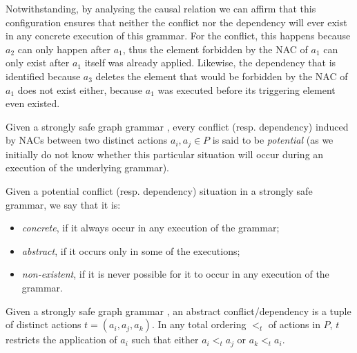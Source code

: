 \begin{example}
Notwithstanding, by analysing the causal relation we can affirm that this configuration ensures that neither the conflict nor the dependency will ever exist in any concrete execution of this grammar. For the conflict, this happens because $a_2$ can only happen after $a_1$, thus the element forbidden by the NAC of $a_1$ can only exist after $a_1$ itself was already applied. Likewise, the dependency that is identified because $a_3$ deletes the element that would be forbidden by the NAC of $a_1$
  does not exist either, because $a_1$ was executed before its triggering element even existed.
\end{example}

\begin{definition}\label{def:conflict-dependency-characterization} Given a strongly safe graph grammar \doublyTypedGraphGrammarCore{}, every conflict (resp. dependency) induced by NACs between two distinct actions $a_i, a_j \in P$ is said to be \emph{potential} (as we initially do not know whether this particular situation will occur during an execution of the underlying grammar). %

    Given a potential conflict (resp. dependency) situation in a strongly safe grammar, we say that it is:
    \begin{itemize}
      \item \emph{concrete}, if it always occur in any execution of the grammar;
      \item \emph{abstract}, if it occurs only in some of the executions;
      \item \emph{non-existent}, if it is never possible for it to occur in any execution of the grammar.
    \end{itemize}
\end{definition}

\begin{definition} Given a strongly safe graph grammar \doublyTypedGraphGrammarCore{}, an abstract conflict/dependency is a tuple of distinct actions $t = (a_i,a_j,a_k)$. In any total ordering $<_t$ of actions in $P$, $t$ restricts the application of $a_i$ such that either $a_i <_t a_j$ or $a_k <_t a_i$.

\hfill
\end{definition}

